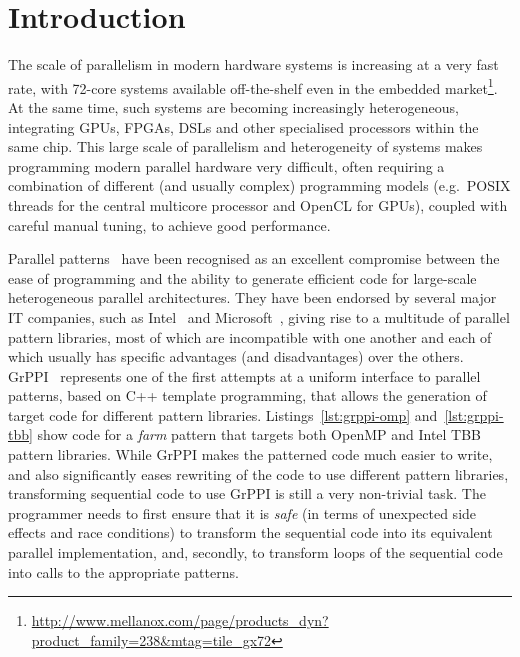 \section{Introduction}
\label{intro}

\noindent
The scale of parallelism in modern hardware systems is increasing at a very fast rate, with 72-core systems available off-the-shelf even in the embedded market\footnote{\url{http://www.mellanox.com/page/products_dyn?product_family=238&mtag=tile_gx72}}. At the same time, such systems are becoming increasingly heterogeneous, integrating GPUs, FPGAs, DSLs and other specialised processors within the same chip. This large scale of parallelism and heterogeneity of systems makes programming modern parallel hardware very difficult, often requiring a combination of different (and usually complex) programming models (e.g.~POSIX threads for the central multicore processor and OpenCL for GPUs), coupled with careful manual tuning, to achieve good performance. 

Parallel patterns~\cite{Asanovic:2009:VPC} have been recognised as an excellent compromise between the ease of programming and the ability to generate efficient code for large-scale heterogeneous parallel architectures. They have been endorsed by several major IT companies, such as Intel~\cite{DBLP:reference/parallel/X11pz} and Microsoft~\cite{ACM:book/msoft/CampbellM11}, giving rise to a multitude of parallel pattern libraries, most of which are incompatible with one another and each of which usually has specific advantages (and disadvantages) over the others. GrPPI~\cite{DBLP:journals/concurrency/AstorgaD0G17} represents one of the first attempts at a uniform interface to parallel patterns, based on C++ template programming, that allows the generation of target code for different pattern libraries. Listings~\ref{lst:grppi-omp} and~\ref{lst:grppi-tbb} show code for a \emph{farm} pattern that targets both OpenMP and Intel TBB pattern libraries. While GrPPI makes the patterned code much easier to write, and also significantly eases rewriting of the code to use different pattern libraries, transforming sequential code to use GrPPI is still a very non-trivial task. The programmer needs to first ensure that it is \emph{safe} (in terms of unexpected side effects and race conditions) to transform the sequential code into its equivalent parallel implementation, and, secondly, to transform loops of the sequential code into calls to the appropriate patterns. 

